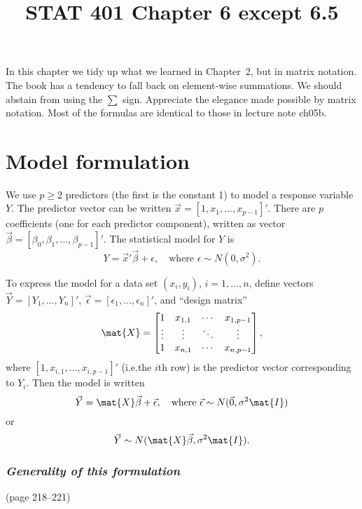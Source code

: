 \documentclass[12pt]{article}
\begin{document}
\title{STAT 401 Chapter 6 except 6.5}
\maketitle

In this chapter we tidy up what we learned in Chapter~2,
but in matrix notation.
The book has a tendency to fall back on element-wise summations.
We should abstain from using the $\sum$ sign.
Appreciate the elegance made possible by matrix notation.
Most of the formulas are identical to those
in lecture note ch05b.


\section{Model formulation}

We use $p \ge 2$ predictors (the first is the constant 1) to model a response
variable $Y$.
The predictor vector can be written $\vec{x} = [1, x_1, \dotsc,
x_{p-1}]'$.
There are $p$ coefficients (one for each predictor component),
written as vector
$\vec{\beta} = [\beta_0, \beta_1,\dotsc, \beta_{p-1}]'$.
The statistical model for $Y$ is
\[
Y = \vec{x}' \vec{\beta} + \epsilon,
\quad\text{where }
\epsilon \sim N(0, \sigma^2)
.
\]

To express the model for a data set
$(x_i, y_i)$, $i = 1, \dotsc, n$,
define vectors
$\vec{Y} = [Y_1,\dotsc, Y_n]'$,
$\vec{\epsilon} = [\epsilon_1,\dotsc, \epsilon_n]'$,
and ``design matrix''
\[
\mat{X} = \begin{bmatrix}
    1 & x_{1,1} & \cdots & x_{1,p-1}\\
    \vdots &  \vdots & \ddots & \vdots \\
    1 & x_{n,1} & \cdots & x_{n,p-1}
    \end{bmatrix}
,
\]
where $[1, x_{i,1}, \dotsc, x_{i,p-1}]'$
(i.e.\@ the $i$th row) is the predictor vector
corresponding to $Y_i$.
Then the model is written
\[
\vec{Y} = \mat{X} \vec{\beta} + \vec{\epsilon},
\quad\text{where }
\vec{\epsilon} \sim N(\vec{0}, \sigma^2\mat{I})
\]
or
\[
\vec{Y} \sim N(\mat{X}\vec{\beta}, \sigma^2\mat{I})
.
\]



\subsubsection{\emph{Generality of this formulation}}
(page 218--221)
\end{document}
